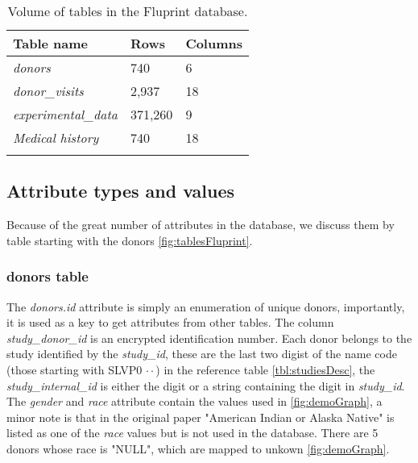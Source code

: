 \begin{table}[htpb]
    \centering
    \begin{tabular}{lll}
        \toprule{}
        \textbf{Table name} & \textbf{Rows} & \textbf{Columns} \\
        \midrule{}
        \textit{donors} &  740 & 6 \\
        \textit{donor\_visits} & 2,937 & 18 \\
        \textit{experimental\_data} & 371,260 & 9 \\
        \textit{Medical history} & 740 & 18 \\
    \bottomrule{}
    \end{tabular}
    \caption{Volume of tables in the Fluprint database.}\label{tbl:volumeTables}
\end{table}

\subsection{Attribute types and values}

Because of the great number of attributes in the database, we discuss them by
table starting with the donors \autoref{fig:tablesFluprint}.

\subsubsection{donors table}

The \textit{donors.id} attribute is simply an enumeration of unique donors,
importantly, it is used as a key to get attributes from other tables. The
column \textit{study\_donor\_id} is an encrypted identification number. Each
donor belongs to the study identified by the \textit{study\_id}, these are the
last two digist of the name code (those starting with SLVP0 \(\cdot\cdot\)) in
the reference table \autoref{tbl:studiesDesc}, the \textit{study\_internal\_id}
is either the digit or a string containing the digit in \textit{study\_id}. The
\textit{gender} and \textit{race} attribute contain the values used in
\autoref{fig:demoGraph}, a minor note is that in the original paper "American
Indian or Alaska Native" is listed as one of the \textit{race} values but is
not used in the database. There are 5 donors whose race is "NULL", which are
mapped to unkown \autoref{fig:demoGraph}.

